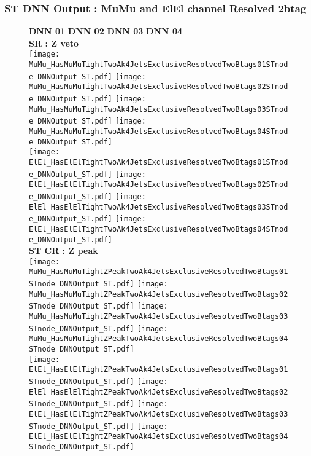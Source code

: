 \documentclass[9pt]{beamer}
\begin{document}
\begin{frame}
	\frametitle{ST DNN Output : MuMu and ElEl channel Resolved 2btag}
	\begin{figure}
	    \textbf{DNN 01} \hspace{1.2cm} \textbf{DNN 02} \hspace{1.2cm} \textbf{DNN 03} \hspace{1.2cm} \textbf{DNN 04} \\
        \centering
        \textbf{SR : Z veto} \\
		\texttt{[image: MuMu\_HasMuMuTightTwoAk4JetsExclusiveResolvedTwoBtags01STnode\_DNNOutput\_ST.pdf]}
		\texttt{[image: MuMu\_HasMuMuTightTwoAk4JetsExclusiveResolvedTwoBtags02STnode\_DNNOutput\_ST.pdf]}
		\texttt{[image: MuMu\_HasMuMuTightTwoAk4JetsExclusiveResolvedTwoBtags03STnode\_DNNOutput\_ST.pdf]}
		\texttt{[image: MuMu\_HasMuMuTightTwoAk4JetsExclusiveResolvedTwoBtags04STnode\_DNNOutput\_ST.pdf]}\\
		\texttt{[image: ElEl\_HasElElTightTwoAk4JetsExclusiveResolvedTwoBtags01STnode\_DNNOutput\_ST.pdf]}
		\texttt{[image: ElEl\_HasElElTightTwoAk4JetsExclusiveResolvedTwoBtags02STnode\_DNNOutput\_ST.pdf]}
		\texttt{[image: ElEl\_HasElElTightTwoAk4JetsExclusiveResolvedTwoBtags03STnode\_DNNOutput\_ST.pdf]}
		\texttt{[image: ElEl\_HasElElTightTwoAk4JetsExclusiveResolvedTwoBtags04STnode\_DNNOutput\_ST.pdf]}\\
        \textbf{ST CR : Z peak} \\
		\texttt{[image: MuMu\_HasMuMuTightZPeakTwoAk4JetsExclusiveResolvedTwoBtags01STnode\_DNNOutput\_ST.pdf]}
		\texttt{[image: MuMu\_HasMuMuTightZPeakTwoAk4JetsExclusiveResolvedTwoBtags02STnode\_DNNOutput\_ST.pdf]}
		\texttt{[image: MuMu\_HasMuMuTightZPeakTwoAk4JetsExclusiveResolvedTwoBtags03STnode\_DNNOutput\_ST.pdf]}
		\texttt{[image: MuMu\_HasMuMuTightZPeakTwoAk4JetsExclusiveResolvedTwoBtags04STnode\_DNNOutput\_ST.pdf]}\\
		\texttt{[image: ElEl\_HasElElTightZPeakTwoAk4JetsExclusiveResolvedTwoBtags01STnode\_DNNOutput\_ST.pdf]}
		\texttt{[image: ElEl\_HasElElTightZPeakTwoAk4JetsExclusiveResolvedTwoBtags02STnode\_DNNOutput\_ST.pdf]}
		\texttt{[image: ElEl\_HasElElTightZPeakTwoAk4JetsExclusiveResolvedTwoBtags03STnode\_DNNOutput\_ST.pdf]}
		\texttt{[image: ElEl\_HasElElTightZPeakTwoAk4JetsExclusiveResolvedTwoBtags04STnode\_DNNOutput\_ST.pdf]}\\
	\end{figure}
\end{frame}
\end{document}
